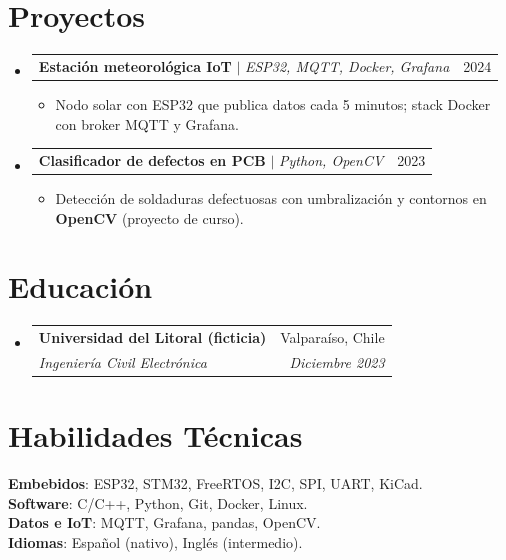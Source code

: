\documentclass[a4paper,11pt]{article}
\makeatletter
\newcommand{\resumeItem}[1]{\item\small{#1}}
\newcommand{\resumeSubheading}[4]{\item\begin{tabular*}{0.97\textwidth}[t]{l@{\extracolsep{\fill}}r}\textbf{#1} & #2 \\ \textit{\small#3} & \textit{\small #4} \\\end{tabular*}}
\newcommand{\resumeProjectHeading}[2]{\item\begin{tabular*}{0.97\textwidth}{l@{\extracolsep{\fill}}r}\small#1 & #2 \\\end{tabular*}}
\makeatother
\begin{document}
\section{Proyectos}
\begin{itemize}[leftmargin=0.15in, label={}]
  \resumeProjectHeading{\textbf{Estación meteorológica IoT} $|$ \emph{ESP32, MQTT, Docker, Grafana}}{2024}
  \begin{itemize}
    \resumeItem{Nodo solar con ESP32 que publica datos cada 5 minutos; stack Docker con broker MQTT y Grafana.}
  \end{itemize}
  \resumeProjectHeading{\textbf{Clasificador de defectos en PCB} $|$ \emph{Python, OpenCV}}{2023}
  \begin{itemize}
    \resumeItem{Detección de soldaduras defectuosas con umbralización y contornos en \textbf{OpenCV} (proyecto de curso).}
  \end{itemize}
\end{itemize}

\section{Educación}
\begin{itemize}[leftmargin=0.15in, label={}]
  \resumeSubheading{Universidad del Litoral (ficticia)}{Valparaíso, Chile}
    {Ingeniería Civil Electrónica}{Diciembre 2023}
\end{itemize}

\section{Habilidades Técnicas}
\begin{itemize}[leftmargin=0.15in, label={}]
  \small{\item{
    \textbf{Embebidos}{: ESP32, STM32, FreeRTOS, I2C, SPI, UART, KiCad.} \\
    \textbf{Software}{: C/C++, Python, Git, Docker, Linux.} \\
    \textbf{Datos e IoT}{: MQTT, Grafana, pandas, OpenCV.} \\
    \textbf{Idiomas}{: Español (nativo), Inglés (intermedio).}
  }}
\end{itemize}
\end{document}
